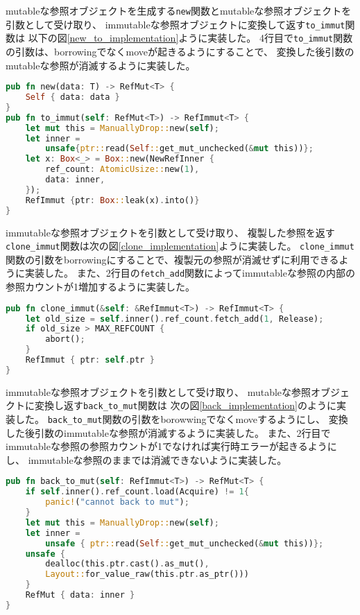 \documentclass{sumiilab-paper}
\theoremstyle{mystyle}
\numberwithin{definition}{chapter} %
\begin{document}
mutableな参照オブジェクトを生成する\texttt{new}関数とmutableな参照オブジェクトを引数として受け取り、
immutableな参照オブジェクトに変換して返す\texttt{to\_immut}関数は
以下の図\ref{new_to_implementation}ように実装した。
4行目で\texttt{to\_immut}関数の引数は、borrowingでなくmoveが起きるようにすることで、
変換した後引数のmutableな参照が消滅するように実装した。
\begin{lstlisting}[language=Rust, caption=関数newと関数to\_immutの実装, label=new_to_implementation, captionpos=b]
pub fn new(data: T) -> RefMut<T> {
    Self { data: data }
}
pub fn to_immut(self: RefMut<T>) -> RefImmut<T> {
    let mut this = ManuallyDrop::new(self);
    let inner =
        unsafe{ptr::read(Self::get_mut_unchecked(&mut this))};
    let x: Box<_> = Box::new(NewRefInner {
        ref_count: AtomicUsize::new(1),
        data: inner,
    });
    RefImmut {ptr: Box::leak(x).into()}
}
\end{lstlisting}

immutableな参照オブジェクトを引数として受け取り、
複製した参照を返す\texttt{clone\_immut}関数は次の図\ref{clone_implementation}ように実装した。
\texttt{clone\_immut}関数の引数をborrowingにすることで、複製元の参照が消滅せずに利用できるように実装した。
また、2行目の\texttt{fetch\_add}関数によってimmutableな参照の内部の参照カウントが1増加するように実装した。
\begin{lstlisting}[language=Rust, caption=関数clone\_immutの実装, label=clone_implementation, captionpos=b]
pub fn clone_immut(&self: &RefImmut<T>) -> RefImmut<T> {
    let old_size = self.inner().ref_count.fetch_add(1, Release);
    if old_size > MAX_REFCOUNT {
        abort();
    }
    RefImmut { ptr: self.ptr }
}
\end{lstlisting}

immutableな参照オブジェクトを引数として受け取り、
mutableな参照オブジェクトに変換し返す\texttt{back\_to\_mut}関数は
次の図\ref{back_implementation}のように実装した。
\texttt{back\_to\_mut}関数の引数をborowwingでなくmoveするようにし、
変換した後引数のimmutableな参照が消滅するように実装した。
また、2行目でimmutableな参照の参照カウントが1でなければ実行時エラーが起きるようにし、
immutableな参照のままでは消滅できないように実装した。
\begin{lstlisting}[language=Rust, caption=関数back\_to\_mutの実装, label=back_implementation, captionpos=b]
pub fn back_to_mut(self: RefImmut<T>) -> RefMut<T> {
    if self.inner().ref_count.load(Acquire) != 1{
        panic!("cannot back to mut");
    }
    let mut this = ManuallyDrop::new(self);
    let inner =
        unsafe { ptr::read(Self::get_mut_unchecked(&mut this))};
    unsafe {
        dealloc(this.ptr.cast().as_mut(), 
        Layout::for_value_raw(this.ptr.as_ptr()))
    }
    RefMut { data: inner }
}
\end{lstlisting}
\end{document}
